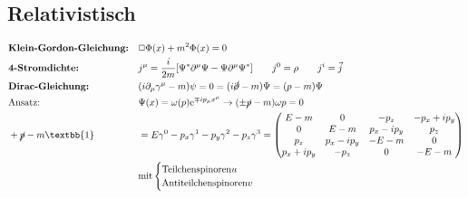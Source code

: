 \documentclass[10pt,a4paper,notitlepage]{scrartcl}
\begin{document}
\subsection*{Relativistisch}
\begin{align*}
    &\textbf{Klein-Gordon-Gleichung:} && \Box\Phi(x) + m^2\Phi(x) = 0 \\
    &\textbf{4-Stromdichte:}&& j^\mu = \frac{i}{2m}[\Psi^\ast\partial^\mu\Psi - \Psi\partial^\mu\Psi^\ast]
    \qquad j^0 = \rho  \qquad j^i = \vec{j}\\
    &\textbf{Dirac-Gleichung:} && (i\partial_\mu\gamma^\mu-m)\psi = 0 = (i\cancel{\partial}-m)\Psi = (p - m) \Psi\\
    &\text{Ansatz:} && \Psi(x) = \omega(p) \text{e}^{\mp i p_\mu x^\mu} \to (\pm \cancel{p}-m)\omega{p}=0\\
    &+\cancel{p} - m\textbb{1} && = E\gamma^0-p_x\gamma^1 -p_y\gamma^2-p_z\gamma^3 = 
    \begin{pmatrix}
        E-m           &     0         &       -p_z        & -p_x + i p_y \\
        0             &     E-m       &   p_x - i p_y     & p_z \\
        p_z           & p_x - i p_y   &      -E-m         & 0 \\
        p_x + i p_y   &     -p_z      &     0             & -E-m \\
    \end{pmatrix}\\
    &&&\text{mit} \begin{cases}
                                 \text{Teilchenspinoren} u \\
                                 \text{Antiteilchenspinoren} v \\
    \end{cases} \\
\end{align*}
\end{document}
